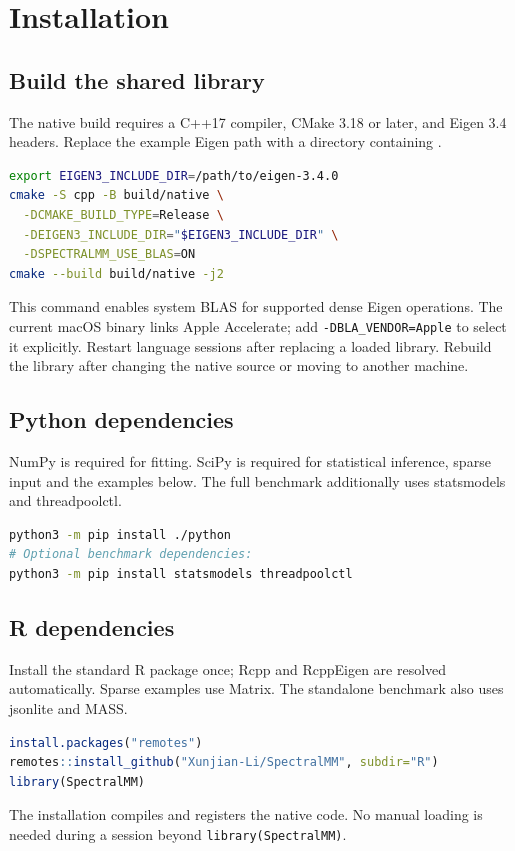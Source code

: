 \documentclass[11pt,a4paper]{article}
\newcommand{\code}[1]{\texttt{#1}}
\begin{document}
\section{Installation}
\subsection{Build the shared library}
The native build requires a C++17 compiler, CMake 3.18 or later, and Eigen 3.4
headers. Replace the example Eigen path with a directory containing
.
\begin{lstlisting}[language=bash]
export EIGEN3_INCLUDE_DIR=/path/to/eigen-3.4.0
cmake -S cpp -B build/native \
  -DCMAKE_BUILD_TYPE=Release \
  -DEIGEN3_INCLUDE_DIR="$EIGEN3_INCLUDE_DIR" \
  -DSPECTRALMM_USE_BLAS=ON
cmake --build build/native -j2
\end{lstlisting}
This command enables system BLAS for supported dense Eigen operations.
The current macOS binary links Apple Accelerate; add
\texttt{-DBLA\_VENDOR=Apple} to select it explicitly.
Restart language sessions after replacing a loaded library.
Rebuild the library after changing the native source or moving to another machine.

\subsection{Python dependencies}
NumPy is required for fitting. SciPy is required for statistical inference, sparse input and the examples
below. The full benchmark additionally uses statsmodels and threadpoolctl.
\begin{lstlisting}[language=bash]
python3 -m pip install ./python
# Optional benchmark dependencies:
python3 -m pip install statsmodels threadpoolctl
\end{lstlisting}

\subsection{R dependencies}
Install the standard R package once; Rcpp and RcppEigen are resolved automatically.
Sparse examples use Matrix. The standalone benchmark also uses jsonlite and MASS.
\begin{lstlisting}[language=R]
install.packages("remotes")
remotes::install_github("Xunjian-Li/SpectralMM", subdir="R")
library(SpectralMM)
\end{lstlisting}
The installation compiles and registers the native code. No manual loading is
needed during a session beyond \code{library(SpectralMM)}.
\end{document}
